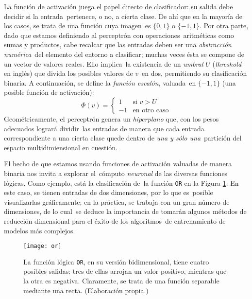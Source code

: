 La función de activación juega el papel directo de clasificador: su salida debe decidir si la entrada\
pertenece, o no, a cierta clase. De ahí que en la mayoría de los casos, se trata de una función cuya imagen\
es $\{0,1\}$ o $\{-1,1\}$. Por otra parte, dado que estamos definiendo al perceptrón con operaciones\
aritméticas como sumas y productos, cabe recalcar que las entradas deben ser una \emph{abstracción numérica}\
del elemento del entorno a clasificar; muchas veces ésta se compone de un vector de valores reales. Ello implica\
la existencia de un \emph{umbral} $U$ (\emph{threshold} en inglés) que divida los posibles valores de $v$\
en dos, permitiendo su clasificación binaria. A continuación, se define la \emph{función escalón}, valuada\
en $\{-1,1\}$ (una posible función de activación):
\begin{equation}
  \Phi(v) =
  \begin{cases}
    1 & \text{si } v > U\\
    -1 & \text{en otro caso}
  \end{cases}
\end{equation}
Geométricamente, el perceptrón genera un \emph{hiperplano} que, con los pesos adecuados logrará dividir\
las entradas de manera que cada entrada correspondiente a una cierta clase quede dentro de \emph{una y sólo una}\
partición del espacio multidimiensional en cuestión.\par
El hecho de que estamos usando funciones de activación valuadas de manera binaria nos invita a explorar el\
cómputo \emph{neuronal} de las diversas funciones lógicas. Como ejemplo, está la clasificación de\
la función \verb+OR+ en la Figura \ref{or-fig}. En este caso, se tienen entradas de dos dimensiones, por lo que es\
posible visualizarlas gráficamente; en la práctica, se trabaja con un gran número de dimensiones, de lo cual\
se deduce la importancia de tomarán algunos métodos de reducción dimensional para el éxito de los algoritmos\
de entrenamiento de modelos más complejos.\par

\begin{figure}[h]
  \centering
  \texttt{[image: or]}
  \caption{La función lógica \texttt{OR}, en su versión bidimensional, tiene cuatro posibles salidas:
    tres de ellas arrojan un valor positivo, mientras que la otra es negativa. Claramente, se trata de una función
    separable mediante una recta.
    (Elaboración propia.)}
  \label{or-fig}
\end{figure}

